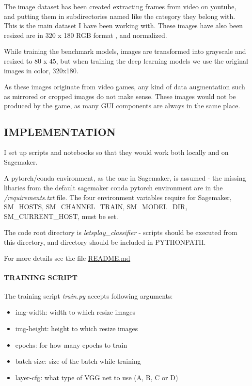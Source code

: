\documentclass[
]{article}
\providecommand{\tightlist}{%
  \setlength{\itemsep}{0pt}\setlength{\parskip}{0pt}}
\begin{document}
The image dataset has been created extracting frames from video on
youtube, and putting them in subdirectories named like the category they
belong with. This is the main dataset I have been working with. These
images have also been resized are in 320 x 180 RGB format , and
normalized.

While training the benchmark models, images are transformed into
grayscale and resized to 80 x 45, but when training the deep learning
models we use the original images in color, 320x180.

As these images originate from video games, any kind of data
augmentation such as mirrored or cropped images do not make sense. These
images would not be produced by the game, as many GUI components are
always in the same place.

\hypertarget{implementation}{%
\subsection{IMPLEMENTATION}\label{implementation}}

I set up scripts and notebooks so that they would work both locally and
on Sagemaker.

A pytorch/conda environment, as the one in Sagemaker, is assumed - the
missing libaries from the default sagemaker conda pytorch environment
are in the \emph{/requirements.txt} file. The four environment variables
require for Sagemaker, SM\_HOSTS, SM\_CHANNEL\_TRAIN, SM\_MODEL\_DIR,
SM\_CURRENT\_HOST, must be set.

The code root directory is \emph{letsplay\_classifier} - scripts should
be executed from this directory, and directory should be included in
PYTHONPATH.

For more details see the file \url{README.md}

\hypertarget{training-script}{%
\paragraph{TRAINING SCRIPT}\label{training-script}}

The training script \emph{train.py} accepts following arguments:

\begin{itemize}
\tightlist
\item
  img-width: width to which resize images
\item
  img-height: height to which resize images
\item
  epochs: for how many epochs to train
\item
  batch-size: size of the batch while training
\item
  layer-cfg: what type of VGG net to use (A, B, C or D)
\end{itemize}
\end{document}
